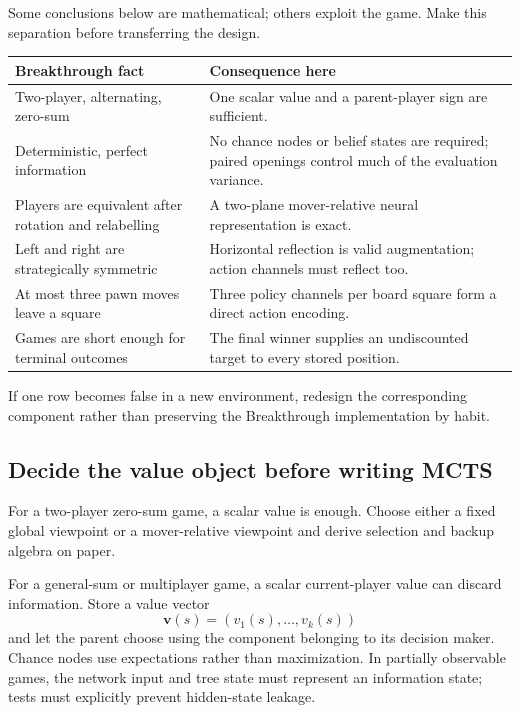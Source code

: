 \documentclass[10.5pt,letterpaper]{article}
\begin{document}
Some conclusions below are mathematical; others exploit the game. Make this
separation before transferring the design.

\begin{center}
\small
\begin{tabularx}{\textwidth}{L{0.28\textwidth} Y}
\toprule
\sffamily\bfseries Breakthrough fact & \sffamily\bfseries Consequence here \\
\midrule
Two-player, alternating, zero-sum &
One scalar value and a parent-player sign are sufficient. \\
Deterministic, perfect information &
No chance nodes or belief states are required; paired openings control much of
the evaluation variance. \\
Players are equivalent after rotation and relabelling &
A two-plane mover-relative neural representation is exact. \\
Left and right are strategically symmetric &
Horizontal reflection is valid augmentation; action channels must reflect too. \\
At most three pawn moves leave a square &
Three policy channels per board square form a direct action encoding. \\
Games are short enough for terminal outcomes &
The final winner supplies an undiscounted target to every stored position. \\
\bottomrule
\end{tabularx}
\end{center}

If one row becomes false in a new environment, redesign the corresponding
component rather than preserving the Breakthrough implementation by habit.

\subsection{Decide the value object before writing MCTS}

For a two-player zero-sum game, a scalar value is enough. Choose either a fixed
global viewpoint or a mover-relative viewpoint and derive selection and backup
algebra on paper.

For a general-sum or multiplayer game, a scalar current-player value can discard
information. Store a value vector
\[
  \mathbf{v}(s) = (v_1(s),\ldots,v_k(s))
\]
and let the parent choose using the component belonging to its decision maker.
Chance nodes use expectations rather than maximization. In partially observable
games, the network input and tree state must represent an information state;
tests must explicitly prevent hidden-state leakage.
\end{document}
